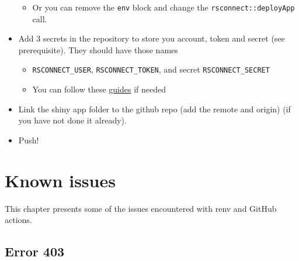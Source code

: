 \documentclass[
]{book}
\newenvironment{Shaded}{\begin{snugshade}}{\end{snugshade}}
\newcommand{\AttributeTok}[1]{\textcolor[rgb]{0.77,0.63,0.00}{#1}}
\newcommand{\CharTok}[1]{\textcolor[rgb]{0.31,0.60,0.02}{#1}}
\newcommand{\FunctionTok}[1]{\textcolor[rgb]{0.00,0.00,0.00}{#1}}
\newcommand{\KeywordTok}[1]{\textcolor[rgb]{0.13,0.29,0.53}{\textbf{#1}}}
\newcommand{\NormalTok}[1]{#1}
\providecommand{\tightlist}{%
  \setlength{\itemsep}{0pt}\setlength{\parskip}{0pt}}
\begin{document}
\begin{itemize}
  \begin{itemize}
  \tightlist
  \item
    Or you can remove the \texttt{env} block and change the \texttt{rsconnect::deployApp} call.
  \end{itemize}

\begin{Shaded}
\end{Shaded}
\item
  Add 3 secrets in the repository to store you account, token and secret (see prerequisite). They should have those names

  \begin{itemize}
  \tightlist
  \item
    \texttt{RSCONNECT\_USER}, \texttt{RSCONNECT\_TOKEN}, and secret \texttt{RSCONNECT\_SECRET}
  \item
    You can follow these \href{https://docs.github.com/en/actions/security-guides/encrypted-secrets\#creating-encrypted-secrets-for-a-repository}{guides} if needed
  \end{itemize}
\item
  Link the shiny app folder to the github repo (add the remote and origin) (if you have not done it already).
\item
  Push!
\end{itemize}

\hypertarget{known-issues}{%
\chapter{Known issues}\label{known-issues}}

This chapter presents some of the issues encountered with renv and GitHub actions.

\hypertarget{error-403}{%
\section{Error 403}\label{error-403}}
\end{document}
